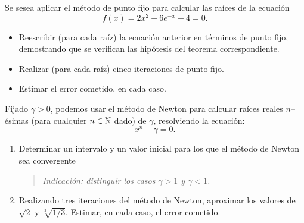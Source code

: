 \begin{EjerciciosPropuestos}

   \begin{problema}
     Se sesea aplicar el método de punto fijo para calcular las raíces
     de la ecuación
     $$
     f(x)=2x^2+6e^{-x}-4=0.
     $$
     \begin{itemize}
     \item Reescribir (para cada raíz) la ecuación anterior en términos
       de punto fijo, demostrando que se verifican las hipótesis del
       teorema correspondiente.
     \item Realizar (para cada raíz) cinco iteraciones de punto fijo.
     \item Estimar el error cometido, en cada caso.
     \end{itemize}
   \end{problema}

   \begin{problema}
     Fijado $\gamma>0$, podemos usar el método de Newton para calcular
     raíces reales $n$--ésimas (para cualquier $n\in\operatorname{{\mathbb N}}$ dado)
     de $\gamma$, resolviendo la ecuación:
     $$
     x^n - \gamma = 0.
     $$
     \begin{enumerate}
     \item Determinar un intervalo y un valor inicial para los que el
       método de Newton sea convergente
       \begin{quote}\em\small
         Indicación: distinguir los casos $\gamma>1$ y $\gamma<1$.
       \end{quote}
     \item Realizando tres iteraciones del método de Newton, aproximar
       los valores de $\sqrt{2}$ y $\sqrt[3]{1/3}$. Estimar, en cada
       caso, el error cometido.
     \end{enumerate}


\end{problema}
\end{EjerciciosPropuestos}
